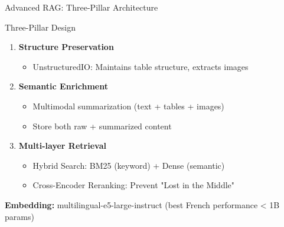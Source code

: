 \documentclass[aspectratio=169]{beamer}
\begin{document}
\begin{frame}{Advanced RAG: Three-Pillar Architecture}
\begin{block}{Three-Pillar Design}
\begin{enumerate}
    \item \textbf{Structure Preservation}
    \begin{itemize}
        \item UnstructuredIO: Maintains table structure, extracts images
    \end{itemize}
    
    \item \textbf{Semantic Enrichment}
    \begin{itemize}
        \item Multimodal summarization (text + tables + images)
        \item Store both raw + summarized content
    \end{itemize}
    
    \item \textbf{Multi-layer Retrieval}
    \begin{itemize}
        \item Hybrid Search: BM25 (keyword) + Dense (semantic)
        \item Cross-Encoder Reranking: Prevent "Lost in the Middle"
    \end{itemize}
\end{enumerate}
\end{block}

\vspace{0.2cm}
\begin{center}
\textbf{Embedding:} multilingual-e5-large-instruct (best French performance < 1B params)
\end{center}
\end{frame}
\end{document}
